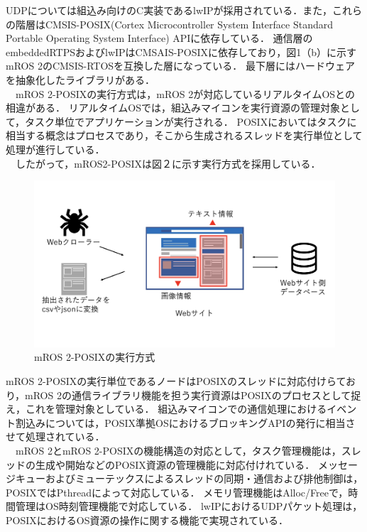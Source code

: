 \documentclass[11pt]{ujarticle}
\begin{document}
UDPについては組込み向けのC実装であるlwIPが採用されている．また，これらの階層はCMSIS-POSIX(Cortex Microcontroller System Interface Standard Portable Operating System Interface) APIに依存している．
通信層のembeddedRTPSおよびlwIPはCMSAIS-POSIXに依存しており，図1（b）に示すmROS 2のCMSIS-RTOSを互換した層になっている．
最下層にはハードウェアを抽象化したライブラリがある．
\\　mROS 2-POSIXの実行方式は，mROS 2が対応しているリアルタイムOSとの相違がある．
リアルタイムOSでは，組込みマイコンを実行資源の管理対象として，タスク単位でアプリケーションが実行される．
POSIXにおいてはタスクに相当する概念はプロセスであり，そこから生成されるスレッドを実行単位として処理が進行している．
\\　したがって，mROS2-POSIXは図２に示す実行方式を採用している．
\begin{figure}[h]
	\includegraphics[width=0.9\linewidth]{./src/selenium.png}
	\caption{mROS 2-POSIXの実行方式}
  \label{fig:arch}
\end{figure}
mROS 2-POSIXの実行単位であるノードはPOSIXのスレッドに対応付けらており，mROS 2の通信ライブラリ機能を担う実行資源はPOSIXのプロセスとして捉え，これを管理対象としている．
組込みマイコンでの通信処理におけるイベント割込みについては，POSIX準拠OSにおけるブロッキングAPIの発行に相当させて処理されている．
\\　mROS 2とmROS 2-POSIXの機能構造の対応として，タスク管理機能は，スレッドの生成や開始などのPOSIX資源の管理機能に対応付けれている．
メッセージキューおよびミューテックスによるスレッドの同期・通信および排他制御は，POSIXではPthreadによって対応している．
メモリ管理機能はAlloc/Freeで，時間管理はOS時刻管理機能で対応している．
lwIPにおけるUDPパケット処理は，POSIXにおけるOS資源の操作に関する機能で実現されている．
\end{document}
